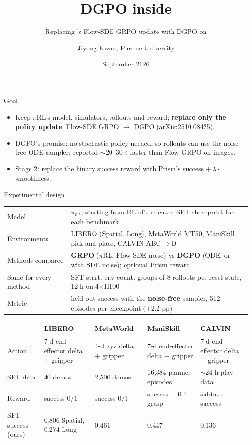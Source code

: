 \documentclass[aspectratio=169,11pt]{beamer}
\title{DGPO inside \pirl}
\subtitle{Replacing \pirl's Flow-SDE GRPO update with DGPO on \pifive}
\author{Jiyong Kwon, Purdue University}
\date{September 2026}
\newcommand{\pirl}{$\pi$RL}
\newcommand{\pifive}{$\pi_{0.5}$}
\begin{document}
\begin{frame}
  \titlepage
\end{frame}

\begin{frame}{Goal}
  \begin{itemize}
    \item Keep \pirl's model, simulators, rollouts and reward;
          \textbf{replace only the policy update}:
          Flow-SDE GRPO $\rightarrow$ DGPO (arXiv:2510.08425).
    \item DGPO's promise: no stochastic policy needed, so rollouts can use the
          noise-free ODE sampler; reported $\sim$20--30$\times$ faster than Flow-GRPO on images.
    \item Stage 2: replace the binary success reward with Prism's
          success $+\,\lambda\cdot$smoothness.
  \end{itemize}
\end{frame}

\begin{frame}{Experimental design}
  \footnotesize
  \begin{tabularx}{\linewidth}{@{}l Y@{}}
    \toprule
    Model & \pifive, starting from RLinf's released SFT checkpoint for each benchmark \\
    Environments & LIBERO (Spatial, Long), MetaWorld MT50, ManiSkill pick-and-place, CALVIN ABC$\rightarrow$D \\
    Methods compared & \textbf{GRPO} (\pirl, Flow-SDE noise) vs \textbf{DGPO} (ODE, or with SDE noise); optional Prism reward \\
    Same for every method & SFT start, env count, groups of 8 rollouts per reset state, 12 h on 4$\times$H100 \\
    Metric & held-out success with the \textbf{noise-free} sampler, 512 episodes per checkpoint ($\pm$2.2 pp) \\
    \bottomrule
  \end{tabularx}
  \vspace{0.5em}

  \scriptsize
  \begin{tabularx}{\linewidth}{@{}l Y Y Y Y@{}}
    \toprule
    & LIBERO & MetaWorld & ManiSkill & CALVIN \\
    \midrule
    Action & 7-d end-effector delta + gripper & 4-d xyz delta + gripper & 7-d end-effector delta + gripper & 7-d end-effector delta + gripper \\
    SFT data & 40 demos & 2,500 demos & 16,384 planner episodes & $\sim$24 h play data \\
    Reward & success 0/1 & success 0/1 & success + 0.1 grasp & subtask success \\
    SFT success (ours) & 0.806 Spatial, 0.274 Long & 0.461 & 0.447 & 0.136 \\
    \bottomrule
  \end{tabularx}
\end{frame}
\end{document}
